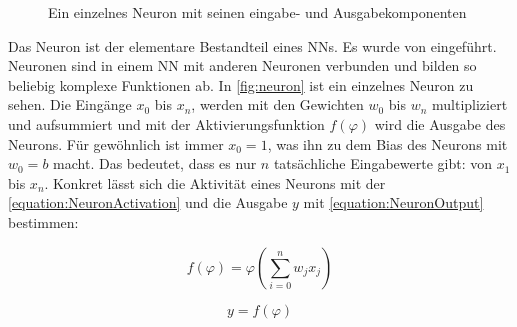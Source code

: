 \begin{figure}
  \centering
  \caption{Ein einzelnes Neuron mit seinen eingabe- und Ausgabekomponenten}
  \label{fig:neuron}
\end{figure}

Das Neuron ist der elementare Bestandteil eines \acp{NN}. Es wurde \citeyear{McCulloch1943} von \citeauthor{McCulloch1943} \cite{McCulloch1943} eingeführt. Neuronen sind in einem \ac{NN} mit anderen Neuronen verbunden und bilden so beliebig komplexe Funktionen ab. In \autoref{fig:neuron} ist ein einzelnes Neuron zu sehen. Die Eingänge $x_{0}$ bis $x_{n}$, werden mit den Gewichten $w_{0}$ bis $w_{n}$ multipliziert und aufsummiert und mit der Aktivierungsfunktion $f(\varphi)$ wird die Ausgabe des Neurons. Für gewöhnlich ist immer $x_{0}=1$, was ihn zu dem Bias des Neurons mit $w_{0}=b$ macht. Das bedeutet, dass es nur $n$ tatsächliche Eingabewerte gibt: von $x_{1}$ bis $x_{n}$. Konkret lässt sich die Aktivität eines Neurons mit der \autoref{equation:NeuronActivation} und die Ausgabe $y$ mit \autoref{equation:NeuronOutput} bestimmen:

\begin{equation}
  f(\varphi) = \varphi(\sum_{i=0}^{n}w_{j}x_{j})
  \label{equation:NeuronActivation}
\end{equation}

\begin{equation}
  y = f(\varphi)
  \label{equation:NeuronOutput}
\end{equation}

